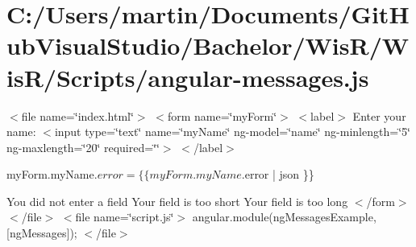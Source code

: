 \hypertarget{_c_1_2_users_2martin_2_documents_2_git_hub_visual_studio_2_bachelor_2_wis_r_2_wis_r_2_scripts_2angular-messages_8js-example}{}\section{C\+:/\+Users/martin/\+Documents/\+Git\+Hub\+Visual\+Studio/\+Bachelor/\+Wis\+R/\+Wis\+R/\+Scripts/angular-\/messages.\+js}
$<$file name=\char`\"{}index.\+html\char`\"{}$>$ $<$form name=\char`\"{}my\+Form\char`\"{}$>$ $<$label$>$ Enter your name\+: $<$input type=\char`\"{}text\char`\"{} name=\char`\"{}my\+Name\char`\"{} ng-\/model=\char`\"{}name\char`\"{} ng-\/minlength=\char`\"{}5\char`\"{} ng-\/maxlength=\char`\"{}20\char`\"{} required=\char`\"{}\char`\"{}$>$ $<$/label$>$ 
\begin{DoxyPre}myForm.myName.$error = \{\{ myForm.myName.$error | json \}\}\end{DoxyPre}


 You did not enter a field Your field is too short Your field is too long  $<$/form$>$ $<$/file$>$ $<$file name=\char`\"{}script.\+js\char`\"{}$>$ angular.\+module(\textquotesingle{}ng\+Messages\+Example\textquotesingle{}, \mbox{[}\textquotesingle{}ng\+Messages\textquotesingle{}\mbox{]}); $<$/file$>$ 


